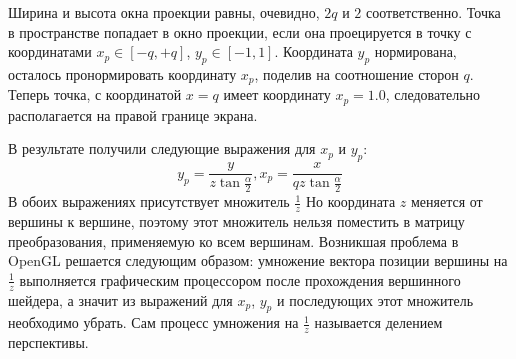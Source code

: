 Ширина и высота окна проекции равны, очевидно, \begin{math}2q\end{math} и \begin{math}2\end{math} соответственно. Точка в пространстве попадает в окно проекции, 
если она проецируется в точку с координатами \begin{math}x_p\in[-q, +q]\end{math},
   \begin{math}y_p\in[-1, 1]\end{math}. Координата \begin{math}y_p\end{math} нормирована, осталось пронормировать координату \begin{math}x_p\end{math}, поделив 
   на соотношение сторон \begin{math}q\end{math}. Теперь точка, с координатой \begin{math}x = q\end{math} имеет координату \begin{math}x_p = 1.0\end{math}, 
   следовательно располагается на правой границе экрана.

В результате получили следующие выражения для \begin{math}x_p\end{math} и \begin{math}y_p\end{math}:
 \begin{equation}y_p = \frac{y}{z\tan{\frac{\alpha}{2}}},    x_p = \frac{x}{qz\tan{\frac{\alpha}{2}}}\end{equation}
   В обоих выражениях присутствует множитель \begin{math}\frac{1}{z}\end{math} Но координата \begin{math}z\end{math} меняется от вершины 
   к вершине, поэтому этот множитель нельзя поместить в матрицу преобразования, применяемую ко всем вершинам. Возникшая проблема в OpenGL 
   решается следующим образом: умножение вектора позиции вершины на \begin{math}\frac{1}{z}\end{math} выполняется графическим процессором после
   прохождения вершинного шейдера, а значит из выражений для \begin{math}x_p\end{math}, \begin{math}y_p\end{math} и последующих этот множитель необходимо убрать.
   Сам процесс умножения на \begin{math}\frac{1}{z}\end{math} называется делением перспективы.

